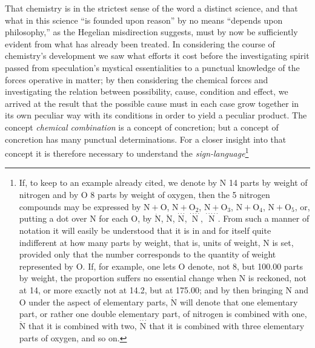 \documentclass[12pt,a4paper]{book}
\begin{document}

That chemistry is in the strictest sense of the word a distinct science, and
that what in this science ``is founded upon reason'' by no means ``depends upon
philosophy,'' as the Hegelian misdirection suggests, must by now be
sufficiently evident from what has already been treated. In considering the
course of chemistry's development we saw what efforts it cost before the
investigating spirit passed from speculation's mystical essentialities to a
punctual knowledge of the forces operative in matter; by then considering the
chemical forces and investigating the relation between possibility, cause,
condition and effect, we arrived at the result that the possible cause must in
each case grow together in its own peculiar way with its conditions in order to
yield a peculiar product. The concept \emph{chemical combination} is a concept
of concretion; but a concept of concretion has many punctual determinations.
For a closer insight into that concept it is therefore necessary to understand
\setcounter{footnote}{0}
the \emph{sign-language}\footnote{If, to keep to an example already cited, we
denote by $\mathrm{N}$ 14 parts by weight of nitrogen and by
$\mathrm{O}$ 8 parts by weight of oxygen, then the 5 nitrogen compounds may be
expressed by $\mathrm{N} + \mathrm{O}$, $\mathrm{N} +
\mathrm{O}_{2}$, $\mathrm{N} + \mathrm{O}_{3}$, $\mathrm{N} +
\mathrm{O}_{4}$, $\mathrm{N} + \mathrm{O}_{5}$, or, putting a dot over
$\mathrm{N}$ for each $\mathrm{O}$, by
$\dot{\mathrm{N}}$, $\ddot{\mathrm{N}}$,
$\stackrel{\cdot\cdot\cdot}{\mathrm{N}}$,
$\stackrel{\cdot\cdot\cdot\cdot}{\mathrm{N}}$,
$\stackrel{\cdot\cdot\cdot\cdot\cdot}{\mathrm{N}}$. From such a manner of
notation it will easily be understood that it is in and for itself quite
indifferent at how many parts by weight, that is, units of weight,
$\mathrm{N}$ is set, provided only that the number corresponds to the quantity
of weight represented by $\mathrm{O}$. If, for example, one lets
$\mathrm{O}$ denote, not 8, but 100.00 parts by weight, the proportion suffers
no essential change when $\mathrm{N}$ is reckoned, not at 14, or more exactly
not at 14.2, but at 175.00; and by then bringing $\mathrm{N}$ and $\mathrm{O}$
under the aspect of elementary parts, $\dot{\mathrm{N}}$ will denote that
one elementary part, or rather one double elementary part, of nitrogen is
combined with one, $\ddot{\mathrm{N}}$ that it is combined with two,
$\stackrel{\cdot\cdot\cdot}{\mathrm{N}}$ that it is combined with
three elementary parts of oxygen, and so on.}
\end{document}
